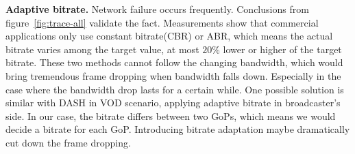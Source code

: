 \textbf{Adaptive bitrate.} Network failure occurs frequently. Conclusions from figure~\ref{fig:trace-all} validate the fact. Measurements show that commercial applications only use constant bitrate(CBR) or ABR, which means the actual bitrate varies among the target value, at most $20\%$ lower or higher of the target bitrate. These two methods cannot follow the changing bandwidth, which would bring tremendous frame dropping when bandwidth falls down. Especially in the case where the bandwidth drop lasts for a certain while. One possible solution is similar with DASH in VOD scenario, applying adaptive bitrate in broadcaster's side. In our case, the bitrate differs between two GoPs, which means we would decide a bitrate for each GoP. Introducing bitrate adaptation maybe dramatically cut down the frame dropping.

\iffalse
\begin{itemize}
\item If we can relax the dependency between frames, the solution space would be larger and more optimal solutions are expected to be found. That is, we can relax the decodability constraints to be $d_i = 1, \forall i$.

\item We can relax queue length constraint, i.e., making $T_1$ larger. This change similarly increases the space of possible solutions.

\item The frame drop strategy can be improved. That is, compared with the naive strategy in OBS (dropping all P/B when exceeding a threshold), selectively choosing frames to drop in IP would give a more optimal solution.
\end{itemize}
\fi

